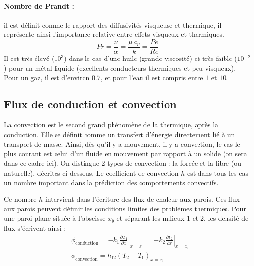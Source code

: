 \paragraph{Nombre de Prandt :}il est définit comme le rapport des diffusivités visqueuse et thermique, il représente ainsi l'importance relative entre effets visqueux et thermiques.
%
\begin{equation}
    Pr = \frac{\nu}{\alpha}
       = \frac{\mu~c_p}{k}
       = \frac{Pe}{Re}
\end{equation}
%
Il est très élevé ($10^3$) dans le cas d'une huile (grande viscosité) et très faible ($10^{-2}$) pour un métal liquide (excellents conducteurs thermiques et peu visqueux). Pour un gaz, il est d'environ $0.7$, et pour l'eau il est compris entre $1$ et $10$.



\subsection{Flux de conduction et convection}
La convection est le second grand phénomène de la thermique, après la conduction. Elle se définit comme un transfert d'énergie directement lié à un transport de masse. Ainsi, dès qu'il y a mouvement, il y a convection, le cas le plus courant est celui d'un fluide en mouvement par rapport à un solide (on sera dans ce cadre ici). On distingue 2 types de convection : la forcée et la libre (ou naturelle), décrites ci-dessous. Le coefficient de convection $h$ est dans tous les cas un nombre important dans la prédiction des comportements convectifs.

Ce nombre $h$ intervient dans l'écriture des flux de chaleur aux parois. Ces flux aux parois peuvent définir les conditions limites des problèmes thermiques. Pour une paroi plane située à l'abscisse $x_0$ et séparant les milieux 1 et 2, les densité de flux s'écrivent ainsi :
%
\begin{align}[left=\empheqlbrace]
    &\phi_{\text{conduction}}
    = - k_1 \left. \frac{\partial{T_1}}{\partial{x}} \right|_{x=x_0}
    = - k_2 \left. \frac{\partial{T_2}}{\partial{x}} \right|_{x=x_0} \\
    &\phi_{\text{convection}}
    = h_{12} \left( T_2 - T_1 \right)_{x=x_0}
    \label{eq:fluxth}
\end{align}


